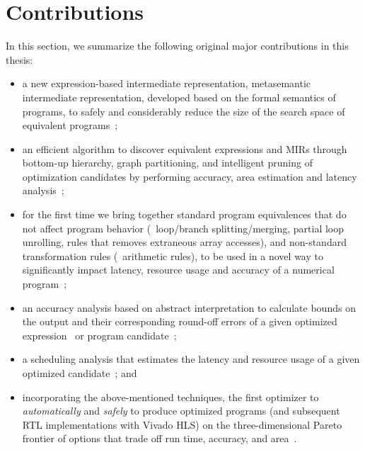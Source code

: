 \section{Contributions}
\label{intro:sec:contributions}

In this section, we summarize the following original major contributions in
this thesis:
\begin{itemize}

    \item a new expression-based intermediate representation, metasemantic
    intermediate representation, developed based on the formal semantics of
    programs, to safely and considerably reduce the size of the search space of
    equivalent programs~\cite{soap2};

    \item an efficient algorithm to discover equivalent expressions and MIRs
    through bottom-up hierarchy, graph partitioning, and intelligent pruning of
    optimization candidates by performing accuracy, area estimation and latency
    analysis~\cite{soap};

    \item for the first time we bring together standard program equivalences
    that do not affect program behavior (\eg~loop/branch splitting/merging,
    partial loop unrolling, rules that removes extraneous array accesses), and
    non-standard transformation rules (\eg~arithmetic rules), to be used in a
    novel way to significantly impact latency, resource usage and accuracy of a
    numerical program~\cite{soap3};

    \item an accuracy analysis based on abstract interpretation to calculate
    bounds on the output and their corresponding round-off errors of a given
    optimized expression~\cite{soap} or program candidate~\cite{soap2};

    \item a scheduling analysis that estimates the latency and resource usage
    of a given optimized candidate~\cite{soap3}; and

    \item incorporating the above-mentioned techniques, the first optimizer to
    \emph{automatically} and \emph{safely} to produce optimized programs (and
    subsequent RTL implementations with Vivado HLS) on the three-dimensional
    Pareto frontier of options that trade off run time, accuracy, and
    area~\cite{soap3}.

\end{itemize}
